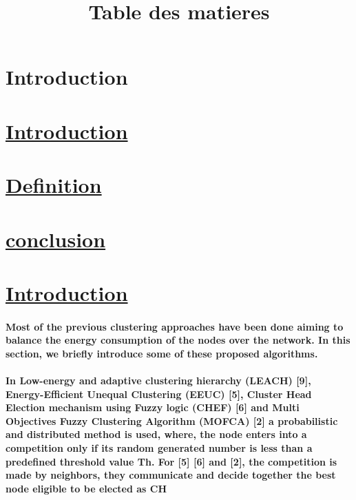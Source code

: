 \documentclass[12 pt]{article}
\begin{document}
\lhead{}
\chead{}
\rfoot{\thepage}
\renewcommand{\headrulewidth}{1pt}
\renewcommand{\footrulewidth}{1pt}


\title {Table des matieres}
\maketitle

\section{Introduction}

\section{\underline{Introduction}}
\section{\underline{Definition}}
 \subsection{}
 \subsection{}
 
\section{\underline{conclusion}}



\newpage
\setcounter{section}{0} 
 { \section{\ul{Introduction}}   }

\paragraph{\qquad
 Most of the previous clustering approaches have been done aiming to balance the energy consumption of the nodes over the network. In this section, we briefly introduce some of these proposed algorithms.}
\raggedleft

\paragraph{\qquad
In Low-energy and adaptive clustering hierarchy (LEACH) [9], Energy-Efficient Unequal Clustering (EEUC) [5], Cluster Head Election mechanism using Fuzzy logic (CHEF) [6] and Multi Objectives Fuzzy Clustering Algorithm (MOFCA) [2] a probabilistic and distributed method is used, where, the node enters into a competition only if its random generated number is less than a predefined threshold value Th. For [5] [6] and [2], the competition is made by neighbors, they communicate and decide together the best node eligible to be elected as CH }\centering
\vspace{3cm}
\end{document}
